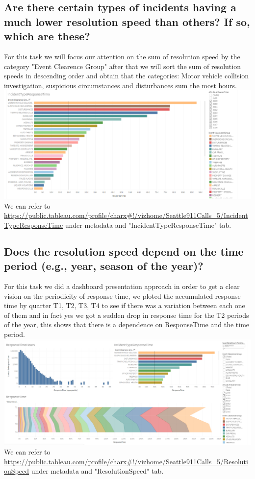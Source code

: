 \documentclass{article}
\begin{document}
    \subsection{Are there certain types of incidents having a much lower resolution speed than others? If so,	which are these?}
    For this task we will focus our attention on the sum of resolution speed by the category "Event Clearence Group" after that we will sort the sum of resolution speeds in descending order and obtain that the categories: Motor vehicle collision investigation, suspicious circumstances and disturbances sum the most hours. 
    \\
    \includegraphics[width=\textwidth]{VisualAnalytics/Assignment2/images/ResponseTimeCategory.PNG}
    \\
    We can refer to \url{https://public.tableau.com/profile/charx#!/vizhome/Seattle911Calls_5/IncidentTypeResponseTime} under metadata and "IncidentTypeResponseTime" tab.
    \subsection{Does the resolution	speed depend on	the	time period	(e.g., year, season	of	the	year)?}
    For this task we did a dashboard presentation approach in order to get a clear vision on the periodicity of response time, we ploted the accumulated response time by quarter T1, T2, T3, T4 to see if there was a variation between each one of them and in fact yes we got a sudden drop in response time for the T2 periods of the year, this shows that there is a dependence on ResponseTime and the time period.
    \\
    \includegraphics[width=\textwidth]{VisualAnalytics/Assignment2/images/ResponseTimeSeason.PNG}
    \\
    We can refer to \url{https://public.tableau.com/profile/charx#!/vizhome/Seattle911Calls_5/ResolutionSpeed} under metadata and "ResolutionSpeed" tab.
\end{document}
